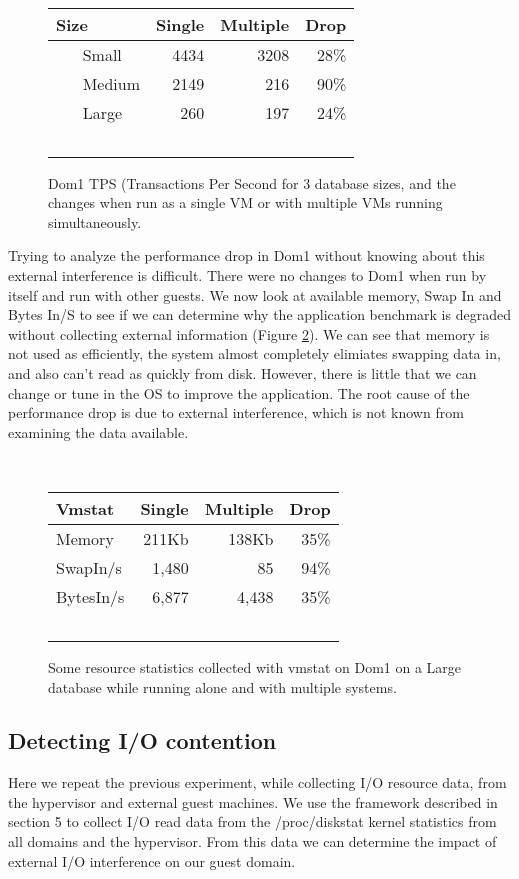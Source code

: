 \begin{figure}
  \begin{tabular}{ l | r | r | r }
    Size & Single & Multiple & Drop \\
    \hline
    Small & 4434 & 3208 & 28\% \\ \hline
    Medium & 2149 & 216 & 90\% \\ \hline
    Large & 260 & 197 & 24\% \\  \hline
  \end{tabular}
\caption{Dom1 TPS (Transactions Per Second for 3 database sizes, and the changes when run as a single VM or with multiple VMs running simultaneously.}
\label{fig:tps1}
\end{figure}

\indent Trying to analyze the performance drop in Dom1 without knowing about this external interference is difficult.  There were no changes to Dom1 when run by itself and run with other guests.  We now look at available memory, Swap In and Bytes In/S to see if we can determine why the application benchmark is degraded without collecting external information (Figure \ref{fig:vmstat}).  We can see that memory is not used as efficiently, the system almost completely elimiates swapping data in, and also can't read as quickly from disk.  However, there is little that we can change or tune in the OS to improve the application.  The root cause of the performance drop is due to external interference, which is not known from examining the data available.
\begin{figure}
  \begin{tabular}{ l | r | r | r }
    Vmstat & Single & Multiple & Drop \\ \hline
	Memory & 211Kb & 138Kb & 35\% \\
	SwapIn/s & 1,480 & 85 & 94\% \\
	BytesIn/s & 6,877 & 4,438 & 35\% \\
  \end{tabular}
\caption{Some resource statistics collected with vmstat on Dom1 on a Large database while running alone and with multiple systems.} 
\label{fig:vmstat}
\end{figure}

\subsection{Detecting I/O contention}
Here we repeat the previous experiment, while collecting I/O resource data, from the hypervisor and external guest machines.  We use the framework described in section 5 to collect I/O read data from the /proc/diskstat kernel statistics from all domains and the hypervisor.  From this data we can determine the impact of external I/O interference on our guest domain.


